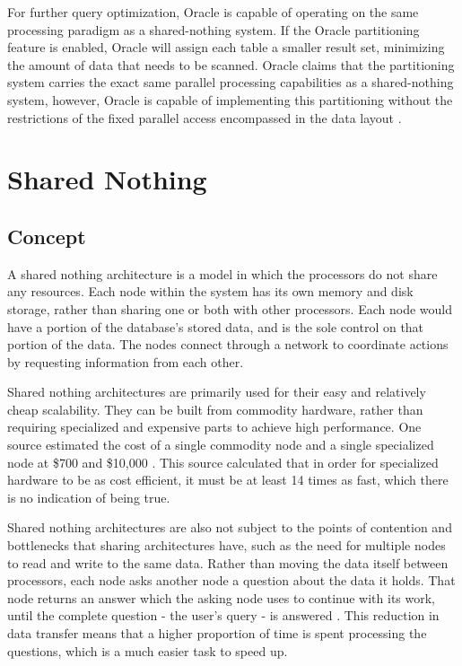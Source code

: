 \documentclass[onecolumn, draftclsnofoot,10pt, compsoc]{IEEEtran}
\begin{document}
For further query optimization, Oracle is capable of operating on the same processing paradigm as a shared-nothing system.
If the Oracle partitioning feature is enabled, Oracle will assign each table a smaller result set, minimizing the amount of data that needs to be scanned. 
Oracle claims that the partitioning system carries the exact same parallel processing capabilities as a shared-nothing system, however, Oracle is capable of implementing this partitioning without the restrictions of the fixed parallel access encompassed in the data layout \cite{OraclePEwODF}.  

	\section{Shared Nothing}
    \subsection{Concept}
A shared nothing architecture is a model in which the processors do not share any resources. 
Each node within the system has its own memory and disk storage, rather than sharing one or both with other processors.
Each node would have a portion of the database’s stored data, and is the sole control on that portion of the data. 
The nodes connect through a network to coordinate actions by requesting information from each other. 

Shared nothing architectures are primarily used for their easy and relatively cheap scalability.
They can be built from commodity hardware, rather than requiring specialized and expensive parts to achieve high performance. 
One source estimated the cost of a single commodity node and a single specialized node at \$700 and \$10,000 \cite{HiPerf}. 
This source calculated that in order for specialized hardware to be as cost efficient, it must be at least 14 times as fast, which there is no indication of being true.

Shared nothing architectures are also not subject to the points of contention and bottlenecks that sharing architectures have, such as the need for multiple nodes to read and write to the same data.
Rather than moving the data itself between processors, each node asks another node a question about the data it holds.
That node returns an answer which the asking node uses to continue with its work, until the complete question - the user’s query - is answered \cite{DeWittFuture}.
This reduction in data transfer means that a higher proportion of time is spent processing the questions, which is a much easier task to speed up.
\end{document}
